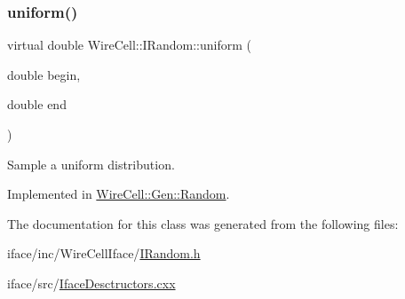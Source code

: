 \mbox{\label{class_wire_cell_1_1_i_random_ac110a2703fe22175c8c074a55a0218a3}} 
\subsubsection{\texorpdfstring{uniform()}{uniform()}}
{\footnotesize\ttfamily virtual double Wire\+Cell\+::\+I\+Random\+::uniform (\begin{DoxyParamCaption}\item[{double}]{begin,  }\item[{double}]{end }\end{DoxyParamCaption})\hspace{0.3cm}{\ttfamily [pure virtual]}}



Sample a uniform distribution. 



Implemented in \hyperlink{class_wire_cell_1_1_gen_1_1_random_aa470ac91289961da741d0d31ccfb83d8}{Wire\+Cell\+::\+Gen\+::\+Random}.



The documentation for this class was generated from the following files\+:\begin{DoxyCompactItemize}
\item 
iface/inc/\+Wire\+Cell\+Iface/\hyperlink{_i_random_8h}{I\+Random.\+h}\item 
iface/src/\hyperlink{_iface_desctructors_8cxx}{Iface\+Desctructors.\+cxx}\end{DoxyCompactItemize}
